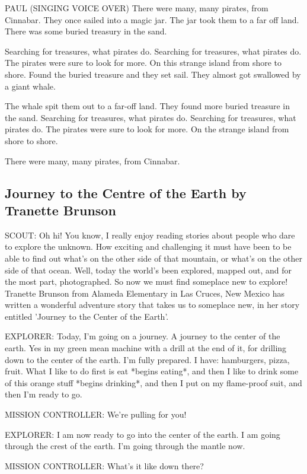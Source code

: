 PAUL (SINGING VOICE OVER)
There were many, many pirates, from Cinnabar.
They once sailed into a magic jar.
The jar took them to a far off land.
There was some buried treasury in the sand.

Searching for treasures, what pirates do.
Searching for treasures, what pirates do.
The pirates were sure to look for more.
On this strange island from shore to shore.
Found the buried treasure and they set sail.
They almost got swallowed by a giant whale.

The whale spit them out to a far-off land.
They found more buried treasure in the sand.
Searching for treasures, what pirates do.
Searching for treasures, what pirates do.
The pirates were sure to look for more.
On the strange island from shore to shore.

There were many, many pirates, from Cinnabar.

\subsection{Journey to the Centre of the Earth by Tranette Brunson}

SCOUT:
Oh hi!
You know, I really enjoy reading stories about people who dare to explore the unknown.
How exciting and challenging it must have been to be able to find out what's on the other side of that mountain, or what's on the other side of that ocean.
Well, today the world's been explored, mapped out, and for the most part, photographed.
So now we must find someplace new to explore!
Tranette Brunson from Alameda Elementary in Las Cruces, New Mexico has written a wonderful adventure story that takes us to someplace new, in her story entitled 'Journey to the Center of the Earth'.

EXPLORER:
Today, I'm going on a journey.
A journey to the center of the earth.
Yes in my green mean machine with a drill at the end of it, for drilling down to the center of the earth.
I'm fully prepared.
I have: hamburgers, pizza, fruit.
What I like to do first is eat *begins eating*, and then I like to drink some of this orange stuff *begins drinking*, and then I put on my flame-proof suit, and then I'm ready to go.

MISSION CONTROLLER:
We're pulling for you!

EXPLORER:
I am now ready to go into the center of the earth.
I am going through the crest of the earth.
I'm going through the mantle now.

MISSION CONTROLLER:
What's it like down there?

